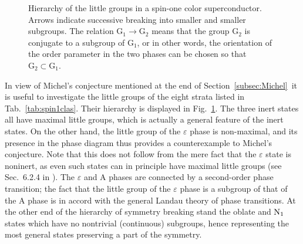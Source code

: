 \documentclass[final,3p,times,12pt,a4paper,sort&compress]{elsarticle}
\newcommand\gr[1]{\mathrm{#1}}              %
\newcommand\ve{\varepsilon}
\begin{document}
\begin{figure}
\begin{center}
\end{center}
\caption{Hierarchy of the little groups in a spin-one color superconductor.
Arrows indicate successive breaking into smaller and smaller subgroups.
The relation $\gr{G_1\to G_2}$ means that the group $\gr{G_2}$ is conjugate to
a subgroup of $\gr{G_1}$, or in other words, the orientation of the order
parameter in the two phases can be chosen so that $\gr{G_2}\subset\gr{G_1}$.}
\label{fig:spin1scheme}
\end{figure}
In view of Michel's conjecture mentioned at the end of
Section~\ref{subsec:Michel}\ it is useful to investigate the little groups of
the eight strata listed in Tab.~\ref{tab:spin1clas}. Their hierarchy is
displayed in Fig.~\ref{fig:spin1scheme}. The three inert states all have
maximal little groups, which is actually a general feature of the inert states.
On the other hand, the little group of the $\ve$ phase is non-maximal, and its
presence in the phase diagram thus provides a counterexample to Michel's
conjecture. Note that this does not follow from the mere fact that the $\ve$
state is noninert, as even such states can in principle have maximal little
groups (see Sec.~6.2.4 in \cite{Vollhardt:1990vw}). The $\ve$ and A phases are
connected by a second-order phase transition; the fact that the little group of
the $\ve$ phase is a subgroup of that of the A phase is in accord with the
general Landau theory of phase transitions. At the other end of the hierarchy of
symmetry breaking stand the oblate and $\text N_1$ states which have no
nontrivial (continuous) subgroups, hence representing the most general states
preserving a part of the symmetry.

\end{document}
